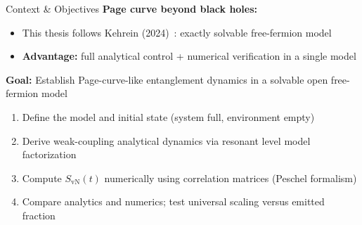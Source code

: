 \documentclass[aspectratio=169,11pt]{beamer}
\begin{document}
\begin{frame}{Context \& Objectives}
\small
    \textbf{Page curve beyond black holes:}
    \begin{itemize}\setlength{\itemsep}{1pt}
        \item This thesis follows Kehrein (2024)~\cite{Kehrein_2024}: \alert{exactly solvable} free-fermion model
        \item \textbf{Advantage:} full analytical control + numerical verification in a single model
    \end{itemize}

    \vspace{0.15cm}
    \textbf{Goal:} Establish Page-curve-like entanglement dynamics in a solvable open free-fermion model

    \vspace{0.1cm}
    \begin{enumerate}\setlength{\itemsep}{1pt}
        \item Define the model and initial state (system full, environment empty)
        \item Derive weak-coupling analytical dynamics via resonant level model factorization
        \item Compute $S_{\mathrm{vN}}(t)$ numerically using correlation matrices (Peschel formalism)
        \item Compare analytics and numerics; test universal scaling versus emitted fraction
    \end{enumerate}
\end{frame}
\end{document}
